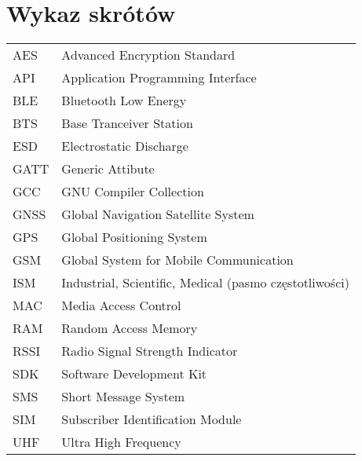 \chapter*{Wykaz skrótów}

\begin{tabular}{l l}
AES & Advanced Encryption Standard \\
API & Application Programming Interface \\
BLE & Bluetooth Low Energy \\
BTS & Base Tranceiver Station \\
ESD & Electrostatic Discharge \\
GATT & Generic Attibute \\
GCC & GNU Compiler Collection \\
GNSS & Global Navigation Satellite System \\
GPS & Global Positioning System \\
GSM & Global System for Mobile Communication \\
ISM & Industrial, Scientific, Medical (pasmo częstotliwości) \\
MAC & Media Access Control \\
RAM & Random Access Memory \\
RSSI & Radio Signal Strength Indicator \\
SDK & Software Development Kit \\
SMS & Short Message System \\
SIM & Subscriber Identification Module \\
UHF & Ultra High Frequency \\




\end{tabular}
